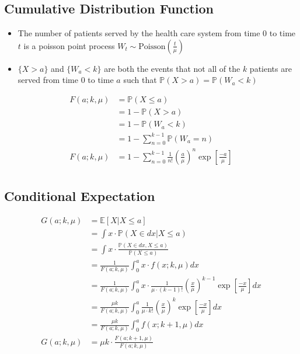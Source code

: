 \documentclass{article}
\begin{document}
\subsection{Cumulative Distribution Function}

\begin{itemize}
	\item The number of patients served by the health care system from time 0 to time $t$ is a poisson point process $W_{t} \sim \text{Poisson} \left( \frac{t}{\mu} \right)$
	\item $\{ X > a \}$ and $\{ W_{a} < k \}$ are both the events that not all of the $k$ patients are served from time 0 to time $a$ such that $\mathbb{P} (X > a) = \mathbb{P} (W_{a} < k)$
\end{itemize}

\begin{align*}
	F (a; k, \mu) & = \mathbb{P} (X \leq a) \\
	& = 1 - \mathbb{P} (X > a) \\
	& = 1 - \mathbb{P} (W_{a} < k) \\
	& = 1 - \sum_{n = 0}^{k - 1} \mathbb{P} (W_{a} = n) \\
	F (a; k, \mu) & = 1 - \sum_{n = 0}^{k - 1} \frac{1}{n!} \left( \frac{a}{\mu} \right)^{n} \exp \left[ \frac{-a}{\mu} \right] \\
\end{align*}

\subsection{Conditional Expectation}

\begin{align*}
	G (a; k, \mu) & = \mathbb{E} [X | X \leq a] \\
	& = \int x \cdot \mathbb{P} (X \in dx | X \leq a) \\
	& = \int x \cdot \frac{\mathbb{P} (X \in dx, X \leq a)}{\mathbb{P} (X \leq a)} \\
	& = \frac{1}{F (a; k, \mu)} \int_{0}^{a} x \cdot f (x; k, \mu) d x \\
	& = \frac{1}{F (a; k, \mu)} \int_{0}^{a} x \cdot \frac{1}{\mu \cdot (k - 1)!} \left( \frac{x}{\mu} \right)^{k - 1} \exp \left[ \frac{-x}{\mu} \right] d x \\
	& = \frac{\mu k}{F (a; k, \mu)} \int_{0}^{a} \frac{1}{\mu \cdot k!} \left( \frac{x}{\mu} \right)^{k} \exp \left[ \frac{-x}{\mu} \right] d x \\
	& = \frac{\mu k}{F (a; k, \mu)} \int_{0}^{a} f (x; k + 1, \mu) d x \\
	G (a; k, \mu) & = \mu k \cdot \frac{F (a; k + 1, \mu)}{F (a; k, \mu)} \\
\end{align*}
\end{document}
